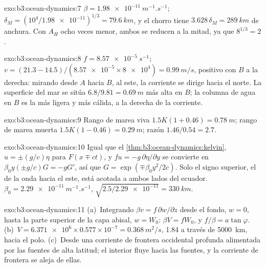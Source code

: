 \begin{solution}{exo:b3:ocean-dynamics:7}
$\beta = \qty{1.98e-11}{m^{-1}.s^{-1}}$; $\delta_M = (10^4/\num{1.98e-11})^{1/3}
= \qty{79.6}{km}$, y el chorro tiene $3.628\,\delta_M = \qty{289}{km}$ de anchura.
Con $A_H$ ocho veces menor, ambos se reducen a la mitad, ya que $8^{1/3} = 2$.
\end{solution}

\begin{solution}{exo:b3:ocean-dynamics:8}
$f = \qty{8.57e-5}{s^{-1}}$; $v = (21.3 - 14.5)/(\num{8.57e-5}\times\num{8e4})
= \qty{0.99}{m/s}$, positivo con $B$ a la derecha: mirando desde $A$ hacia $B$,
al este, la corriente se dirige hacia el norte. La superficie del mar se sitúa
$6.8/9.81 = \qty{0.69}{m}$ más alta en $B$; la columna de agua en $B$ es la
más ligera y más cálida, a la derecha de la corriente.
\end{solution}

\begin{solution}{exo:b3:ocean-dynamics:9}
Rango de marea viva $1.5K(1 + 0.46) = \qty{0.78}{m}$; rango de marea muerta $1.5K(1 - 0.46)
= \qty{0.29}{m}$; razón $1.46/0.54 = 2.7$.
\end{solution}

\begin{solution}{exo:b3:ocean-dynamics:10}
Igual que el \cref{thm:b3:ocean-dynamics:kelvin}, $u = \pm(g/c)\eta$ para $F(x \mp
ct)$, y $fu = -g\,\partial\eta/\partial y$ se convierte en $\beta_0y(\pm g/c)G =
-gG'$, así que $G = \exp(\mp\beta_0y^2/2c)$. Solo el signo superior, el de la
onda hacia el este, está acotada a ambos lados del ecuador. $\beta_0 =
\qty{2.29e-11}{m^{-1}.s^{-1}}$, $\sqrt{2.5/\num{2.29e-11}} = \qty{330}{km}$.
\end{solution}

\begin{solution}{exo:b3:ocean-dynamics:11}
(a)~Integrando $\beta v = f\,\partial w/\partial z$ desde el fondo, $w = 0$,
hasta la parte superior de la capa abisal, $w = W_0$: $\beta V = fW_0$, y $f/\beta =
a\tan\varphi$. (b)~$V = \num{6.371e6}\times0.577\times10^{-7} =
\qty{0.368}{m^2/s}$, \qty{1.84}{\sverdrup} a través de \qty{5000}{km}, hacia el polo.
(c)~Desde una corriente de frontera occidental profunda alimentada por las fuentes de alta latitud;
el interior fluye hacia las fuentes, y la corriente de frontera se aleja
de ellas.
\end{solution}

